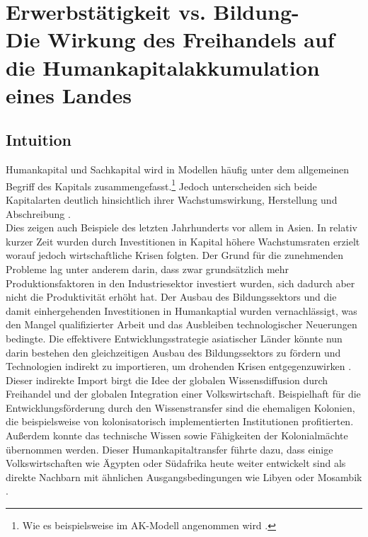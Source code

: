 \chapter{Erwerbstätigkeit vs. Bildung-\\Die Wirkung des Freihandels auf die Humankapitalakkumulation eines Landes}
\label{Papier2}

\section{Intuition}
Humankapital und Sachkapital wird in Modellen häufig unter dem allgemeinen Begriff des Kapitals zusammengefasst.\footnote{Wie es beispielsweise im AK-Modell angenommen wird \cite{Rebelo.1991}.} Jedoch unterscheiden sich beide Kapitalarten deutlich hinsichtlich ihrer Wachstumswirkung, Herstellung und Abschreibung \cite{Ortigueira.1997}.\\
%
Dies zeigen auch Beispiele des letzten Jahrhunderts vor allem in Asien. In relativ kurzer Zeit wurden durch Investitionen in Kapital höhere Wachstumsraten erzielt worauf jedoch wirtschaftliche Krisen folgten. Der Grund für die zunehmenden Probleme lag unter anderem darin, dass zwar grundsätzlich mehr Produktionsfaktoren in den Industriesektor investiert wurden, sich dadurch aber nicht die Produktivität erhöht hat. Der Ausbau des Bildungssektors und die damit einhergehenden Investitionen in Humankaptial wurden  vernachlässigt, was den Mangel qualifizierter Arbeit und das Ausbleiben technologischer Neuerungen bedingte. Die effektivere Entwicklungsstrategie asiatischer Länder könnte nun darin bestehen den gleichzeitigen Ausbau des Bildungssektors zu fördern und Technologien indirekt zu importieren, um drohenden Krisen entgegenzuwirken \cite{Krugman.2015}. \\
%
Dieser indirekte Import birgt die Idee der globalen Wissensdiffusion durch Freihandel und der globalen Integration einer Volkswirtschaft. Beispielhaft für die Entwicklungsförderung durch den Wissenstransfer sind die ehemaligen Kolonien, die beispielsweise von kolonisatorisch implementierten Institutionen profitierten. Außerdem konnte das technische Wissen sowie Fähigkeiten der Kolonialmächte übernommen werden. Dieser Humankapitaltransfer führte dazu, dass einige Volkswirtschaften wie Ägypten oder Südafrika heute weiter entwickelt sind als direkte Nachbarn mit ähnlichen Ausgangsbedingungen wie Libyen oder Mosambik \cite{Acemoglu.2000b}.\\
%
